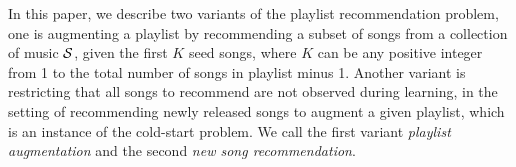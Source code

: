 In this paper, we describe two variants of the playlist recommendation problem,
one is augmenting a playlist by recommending a subset of songs from a collection of music $\mathcal{S}$,
given the first $K$ seed songs, where $K$ can be any positive integer from 1 to the total number of songs in playlist minus 1.
Another variant is restricting that all songs to recommend are not observed during learning,
\ie in the setting of recommending newly released songs to augment a given playlist, which is an instance of the cold-start problem.
We call the first variant \emph{playlist augmentation} and the second \emph{new song recommendation}.
